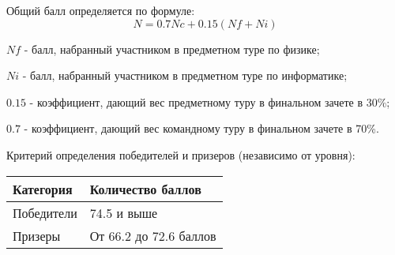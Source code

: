 Общий балл определяется по формуле:
$$N = 0.7Nc +0.15(Nf + Ni)$$

$Nf$ - балл, набранный участником в предметном туре по физике;

$Ni$ - балл, набранный участником в предметном туре по информатике;

$0.15$ - коэффициент, дающий вес предметному туру в финальном зачете в 30\%;

$0.7$ - коэффициент, дающий вес командному туру в финальном зачете в 70\%.

Критерий определения победителей и призеров (независимо от уровня):
\begin{center}
    \begin{tabular}{|l|l|}
        \hline
        Категория&Количество баллов\\
        \hline
        Победители&74.5 и выше\\
        \hline
        Призеры&От 66.2 до 72.6 баллов\\
        \hline
    \end{tabular}
\end{center}
